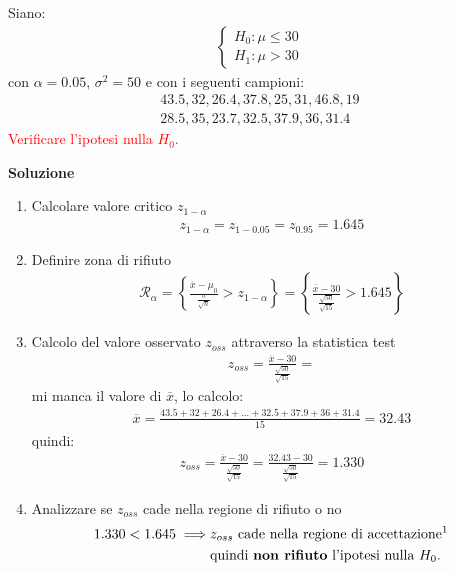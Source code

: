 \documentclass{article}  %
\theoremstyle{definition}
\begin{document}
\begin{esercizio}[Esercizio 2]
	Siano:
	\begin{align*}
		\begin{cases}
			H_0: \mu \leq 30 \\
			H_1: \mu > 30
		\end{cases}
	\end{align*}
	con $\alpha=0.05$, $\sigma^2=50$ e con i seguenti campioni:
	\begin{align*}
		43.5, 32, 26.4, 37.8, 25, 31, 46.8, 19 \\
		28.5, 35, 23.7, 32.5, 37.9, 36, 31.4
	\end{align*}
	\textcolor{red}{Verificare l'ipotesi nulla $H_0$.}
	\begin{center}
		\textbf{Soluzione}
	\end{center}
	\begin{enumerate}
		\item Calcolare valore critico $z_{1-\alpha}$
		      \begin{align*}
			      z_{1-\alpha}=z_{1-0.05}=z_{0.95}=1.645
		      \end{align*}
		\item Definire zona di rifiuto
		      \begin{align*}
			      \mathcal{R}_{\alpha}=\left\{\frac{\overline{x}-\mu_0}{\frac{\sigma}{\sqrt{n}}} > z_{1-\alpha}\right\}=\left\{\frac{\overline{x}-30}{\frac{\sqrt{50}}{\sqrt{15}}} > 1.645 \right\}
		      \end{align*}
		\item Calcolo del valore osservato $z_{oss}$ attraverso la statistica test
		      \begin{align*}
			      z_{oss}=\frac{\overline{x}-30}{\frac{\sqrt{50}}{\sqrt{15}}} =
		      \end{align*}
		      mi manca il valore di $\overline{x}$, lo calcolo:
		      \begin{align*}
			      \overline{x} = \frac{43.5+32+ 26.4+ \dots + 32.5+ 37.9+ 36+ 31.4}{15} = 32.43
		      \end{align*}
		      quindi:
		      \begin{align*}
			      z_{oss}=\frac{\overline{x}-30}{\frac{\sqrt{50}}{\sqrt{15}}} = \frac{32.43-30}{\frac{\sqrt{50}}{\sqrt{15}}} = 1.330
		      \end{align*}
		\item Analizzare se $z_{oss}$ cade nella regione di rifiuto o no
		      \begin{align*}
			      1.330 < 1.645 \implies & z_{oss} \text{ cade nella regione di accettazione\footnotemark} \\
			                             & \text{quindi \textbf{non rifiuto} l'ipotesi nulla } H_0.
		      \end{align*}
	\end{enumerate}
\end{esercizio}
\end{document}
